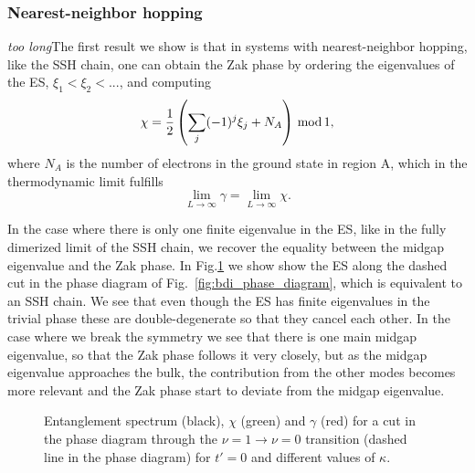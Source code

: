 \documentclass[twocolumn,amsmath,longbibliography,amssymb,superscriptaddress]{revtex4-1}
\newcommand{\mariac}[1]{{\it\color{cyan}#1}}
\begin{document}
\subsubsection{Nearest-neighbor hopping}
\mariac{too long}The first result we show is that in systems with nearest-neighbor hopping, like the SSH chain, one can obtain the Zak phase by ordering the eigenvalues of the ES, $\xi_1 < \xi_2 < ...$, and computing
\begin{equation}
\chi = \frac{1}{2}\left(\sum_j (-1)^j \xi_j+N_A\right) \, {\rm mod} \, 1,
\label{eqplusminus}
\end{equation}
where $N_A$ is the number of electrons in the ground state in region A, which in the thermodynamic limit fulfills
\begin{equation}
\lim_{L \rightarrow \infty} \gamma = \lim_{L \rightarrow \infty} \chi.
\end{equation}

In the case where there is only one finite eigenvalue in  the ES, like in the fully dimerized limit of the SSH chain, we recover the equality between the midgap eigenvalue and the Zak phase. In Fig.\ref{huang} we show show the ES along the dashed cut in the phase diagram of Fig.~\ref{fig:bdi_phase_diagram}, which is equivalent to an SSH chain. We see that even though the ES has finite eigenvalues in the trivial phase these are double-degenerate so that they cancel each other. In the case where we break the symmetry we see that there is one main midgap eigenvalue, so that the Zak phase follows it very closely, but as the midgap eigenvalue approaches the bulk, the contribution from the other modes becomes more relevant and the Zak phase start to deviate from the midgap eigenvalue.
\begin{figure}[h!]
\centering
{}
\caption{Entanglement spectrum (black), $\chi$ (green) and $\gamma$ (red) for a cut in the phase diagram through the $\nu = 1 \rightarrow \nu = 0$ transition (dashed line in the phase diagram) for $t'=0$ and different values of $\kappa$.}
\label{huang}
\end{figure}
\end{document}
